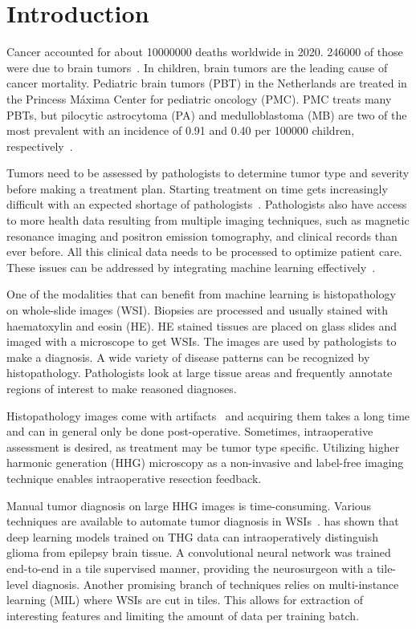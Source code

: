\section{Introduction}

Cancer accounted for about \num{10000000} deaths worldwide in 2020.
\num{246000} of those were due to brain tumors~.
In children, brain tumors are the leading cause of cancer mortality.
Pediatric brain tumors (PBT) in the Netherlands are treated in the Princess Máxima Center for pediatric oncology (PMC).
PMC treats many PBTs, but pilocytic astrocytoma (PA) and medulloblastoma (MB) are two of the most prevalent with an incidence of 0.91 and 0.40 per 100000 children, respectively~.

Tumors need to be assessed by pathologists to determine tumor type and severity before making a treatment plan.
Starting treatment on time gets increasingly difficult with an expected shortage of pathologists~.
Pathologists also have access to more health data resulting from multiple imaging techniques, such as magnetic resonance imaging and positron emission tomography, and clinical records than ever before.
All this clinical data needs to be processed to optimize patient care.
These issues can be addressed by integrating machine learning effectively~.

One of the modalities that can benefit from machine learning is histopathology on whole-slide images (WSI).
Biopsies are processed and usually stained with haematoxylin and eosin (HE).
HE stained tissues are placed on glass slides and imaged with a microscope to get WSIs.
The images are used by pathologists to make a diagnosis.
A wide variety of disease patterns can be recognized by histopathology.
Pathologists look at large tissue areas and frequently annotate regions of interest to make reasoned diagnoses.

Histopathology images come with artifacts~ and acquiring them takes a long time and can in general only be done post-operative.
Sometimes, intraoperative assessment is desired, as treatment may be tumor type specific.
Utilizing higher harmonic generation (HHG) microscopy as a non-invasive and label-free imaging technique enables intraoperative resection feedback.

Manual tumor diagnosis on large HHG images is time-consuming.
Various techniques are available to automate tumor diagnosis in WSIs~.
\citeauthor{Blokker2022}  has shown that deep learning models trained on THG data can intraoperatively distinguish glioma from epilepsy brain tissue.
A convolutional neural network was trained end-to-end in a tile supervised manner, providing the neurosurgeon with a tile-level diagnosis.
Another promising branch of techniques relies on multi-instance learning (MIL) where WSIs are cut in tiles.
This allows for extraction of interesting features and limiting the amount of data per training batch.

